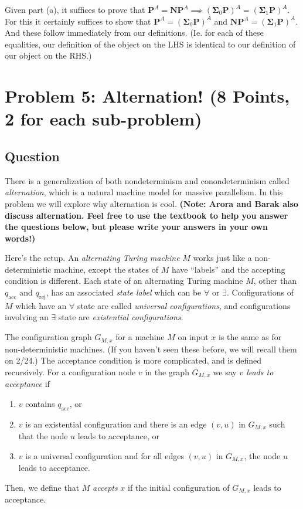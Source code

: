 \documentclass{article}
\renewcommand{\P}{\mathbf{P}}
\newcommand{\NP}{\mathbf{NP}}
\newcommand{\BSigma}{\mathbf{\Sigma}}
\begin{document}
Given part (a), it suffices to prove that $\P^A = \NP^A \implies (\BSigma_0 \P)^A = (\BSigma_1 \P)^A$.  For this it certainly suffices to show that $\P^A = (\BSigma_0 \P)^A$ and $\NP^A = (\BSigma_1 \P)^A$.  And these follow immediately from our definitions.  (Ie. for each of these equalities, our definition of the object on the LHS is identical to our definition of our object on the RHS.)


\section*{Problem 5: Alternation! (8 Points, 2 for each sub-problem)}

\subsection*{Question}

There is a generalization of both nondeterminism and conondeterminism called \emph{alternation}, which is a natural machine model for massive parallelism. In this problem we will explore why alternation is cool. {\bf (Note: Arora and Barak also discuss alternation. Feel free to use the textbook to help you answer the questions below, but please write your  answers in your own words!)}

Here's the setup. An {\em alternating Turing machine} $M$ works just like a non-deterministic machine, except the states of $M$ have ``labels'' and the accepting condition is different. Each state of an alternating Turing machine $M$, other than $q_{\text{acc}}$ and $q_{\text{rej}}$, has an associated \emph{state label} which can be $\forall$ or $\exists$. Configurations of $M$ which have an $\forall$ state are called {\em universal configurations}, and configurations involving an $\exists$ state are {\em existential configurations}. 

The configuration graph $G_{M,x}$ for a machine $M$ on input $x$ is the same as for non-deterministic machines. (If you haven't seen these before, we will recall them on 2/24.) The acceptance condition is more complicated, and is defined recursively. For a configuration node $v$ in the graph $G_{M,x}$ we say {\em $v$ leads to acceptance} if \begin{enumerate}
\item $v$ contains $q_{\text{acc}}$, or 
\item $v$ is an existential configuration and there is an edge $(v,u)$ in $G_{M,x}$ such that the node $u$ leads to acceptance, or 
\item $v$ is a universal configuration and for all edges $(v,u)$ in $G_{M,x}$, the node $u$ leads to acceptance. 
\end{enumerate}
Then, we define that $M$ \emph{accepts} $x$ if the initial
configuration of $G_{M,x}$ leads to acceptance. 
\end{document}
